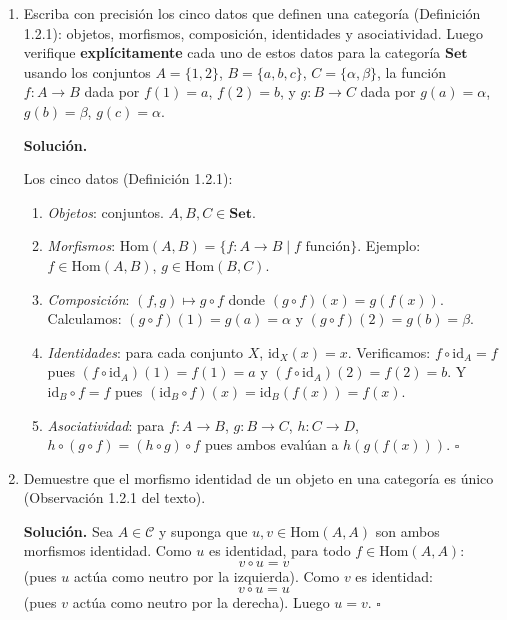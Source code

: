 \bigskip

\begin{enumerate}[label=\textbf{3.\arabic*.}]

\item Escriba con precisión los cinco datos que definen una categoría (Definición 1.2.1):
objetos, morfismos, composición, identidades y asociatividad. Luego verifique
\textbf{explícitamente} cada uno de estos datos para la categoría \(\mathbf{Set}\)
usando los conjuntos \(A=\{1,2\}\), \(B=\{a,b,c\}\), \(C=\{\alpha,\beta\}\),
la función \(f:A\to B\) dada por \(f(1)=a\), \(f(2)=b\), y \(g:B\to C\) dada
por \(g(a)=\alpha\), \(g(b)=\beta\), \(g(c)=\alpha\).

\textbf{Solución.}

Los cinco datos (Definición 1.2.1):
\begin{enumerate}[label=\arabic*.]
    \item \textit{Objetos}: conjuntos. \(A,B,C \in \mathbf{Set}\).
    \item \textit{Morfismos}: \(\mathrm{Hom}(A,B)=\{f:A\to B \mid f \text{ función}\}\).
    Ejemplo: \(f \in \mathrm{Hom}(A,B)\), \(g \in \mathrm{Hom}(B,C)\).
    \item \textit{Composición}: \((f,g) \mapsto g\circ f\) donde
    \((g\circ f)(x)=g(f(x))\).
    Calculamos: \((g\circ f)(1)=g(a)=\alpha\) y \((g\circ f)(2)=g(b)=\beta\).
    \item \textit{Identidades}: para cada conjunto \(X\), \(\mathrm{id}_X(x)=x\).
    Verificamos: \(f\circ\mathrm{id}_A = f\) pues
    \((f\circ\mathrm{id}_A)(1)=f(1)=a\) y \((f\circ\mathrm{id}_A)(2)=f(2)=b\).
    Y \(\mathrm{id}_B\circ f = f\) pues \((\mathrm{id}_B\circ f)(x)=\mathrm{id}_B(f(x))=f(x)\).
    \item \textit{Asociatividad}: para \(f:A\to B\), \(g:B\to C\), \(h:C\to D\),
    \(h\circ(g\circ f)=(h\circ g)\circ f\) pues ambos evalúan a \(h(g(f(x)))\).
    \hfill\(\square\)
\end{enumerate}

\item Demuestre que el morfismo identidad de un objeto en una categoría es único
(Observación 1.2.1 del texto).

\textbf{Solución.}
Sea \(A \in \mathcal{C}\) y suponga que \(u, v \in \mathrm{Hom}(A,A)\) son ambos
morfismos identidad. Como \(u\) es identidad, para todo \(f \in \mathrm{Hom}(A,A)\):
\[
    v \circ u = v
\]
(pues \(u\) actúa como neutro por la izquierda).
Como \(v\) es identidad:
\[
    v \circ u = u
\]
(pues \(v\) actúa como neutro por la derecha).
Luego \(u = v\). \hfill\(\square\)


\end{enumerate}
